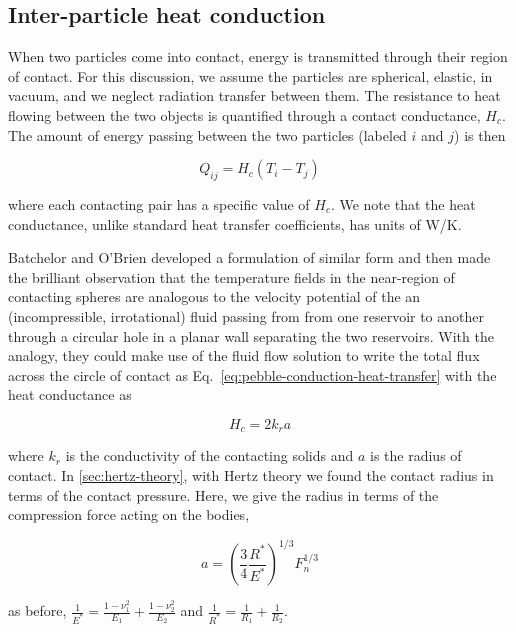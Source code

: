 \subsection{Inter-particle heat conduction}\label{sec:ht-pebble-conduction}

When two particles come into contact, energy is transmitted through their region of contact. For this discussion, we assume the particles are spherical, elastic, in vacuum, and we neglect radiation transfer between them. The resistance to heat flowing between the two objects is quantified through a contact conductance, $H_c$. The amount of energy passing between the two particles (labeled $i$ and $j$) is then

\begin{equation}\label{eq:pebble-conduction-heat-transfer}
	Q_{ij} = H_{c}(T_i - T_j)
\end{equation}

where each contacting pair has a specific value of $H_c$. We note that the heat conductance, unlike standard heat transfer coefficients, has units of \si{W/K}.

Batchelor and O'Brien\cite{Batchelor1977} developed a formulation of similar form and then made the brilliant observation that the temperature fields in the near-region of contacting spheres are analogous to the velocity potential of the an (incompressible, irrotational) fluid passing from from one reservoir to another through a circular hole in a planar wall separating the two reservoirs. With the analogy, they could make use of the fluid flow solution to write the total flux across the circle of contact as Eq.~\ref{eq:pebble-conduction-heat-transfer} with the heat conductance as

\begin{equation}\label{eq:batchelor-pebble-conductance}
	H_c = 2k_ra
\end{equation}

where $k_r$ is the conductivity of the contacting solids and $a$ is the radius of contact. In \cref{sec:hertz-theory}, with Hertz theory we found the contact radius in terms of the contact pressure. Here, we give the radius in terms of the compression force acting on the bodies,

\begin{equation}
	a =  \left(\frac{3}{4}\frac{R^*}{E^*}\right)^{1/3}F_n^{1/3}	
\end{equation}

as before, $\frac{1}{E^*} = \frac{1-\nu_1^2}{E_1} + \frac{1-\nu_2^2}{E_2}$ and $\frac{1}{R^*} = \frac{1}{R_1} + \frac{1}{R_2}$. 

